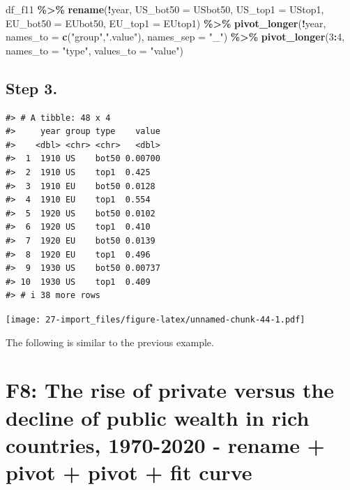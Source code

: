 \documentclass[
  xelatex, ja=standard]{bxjsbook}
\newenvironment{Shaded}{\begin{snugshade}}{\end{snugshade}}
\newcommand{\AttributeTok}[1]{\textcolor[rgb]{0.13,0.29,0.53}{#1}}
\newcommand{\DecValTok}[1]{\textcolor[rgb]{0.00,0.00,0.81}{#1}}
\newcommand{\FunctionTok}[1]{\textcolor[rgb]{0.13,0.29,0.53}{\textbf{#1}}}
\newcommand{\NormalTok}[1]{#1}
\newcommand{\SpecialCharTok}[1]{\textcolor[rgb]{0.81,0.36,0.00}{\textbf{#1}}}
\newcommand{\StringTok}[1]{\textcolor[rgb]{0.31,0.60,0.02}{#1}}
\theoremstyle{definition}
\theoremstyle{definition}
\theoremstyle{definition}
\theoremstyle{definition}
\theoremstyle{remark}
\begin{document}
\begin{Shaded}
\begin{Highlighting}[]
\NormalTok{df\_f11 }\SpecialCharTok{\%\textgreater{}\%} 
  \FunctionTok{rename}\NormalTok{(}\SpecialCharTok{!}\NormalTok{year, }\AttributeTok{US\_bot50 =}\NormalTok{ USbot50, }\AttributeTok{US\_top1 =}\NormalTok{ UStop1, }
         \AttributeTok{EU\_bot50 =}\NormalTok{ EUbot50, }\AttributeTok{EU\_top1 =}\NormalTok{ EUtop1) }\SpecialCharTok{\%\textgreater{}\%}
  \FunctionTok{pivot\_longer}\NormalTok{(}\SpecialCharTok{!}\NormalTok{year, }\AttributeTok{names\_to =} \FunctionTok{c}\NormalTok{(}\StringTok{"group"}\NormalTok{,}\StringTok{".value"}\NormalTok{), }
               \AttributeTok{names\_sep =} \StringTok{"\_"}\NormalTok{) }\SpecialCharTok{\%\textgreater{}\%}
  \FunctionTok{pivot\_longer}\NormalTok{(}\DecValTok{3}\SpecialCharTok{:}\DecValTok{4}\NormalTok{, }\AttributeTok{names\_to =} \StringTok{"type"}\NormalTok{, }\AttributeTok{values\_to =} \StringTok{"value"}\NormalTok{) }
\end{Highlighting}
\end{Shaded}

\hypertarget{step-3.-1}{%
\subsection{Step 3.}\label{step-3.-1}}

\begin{verbatim}
#> # A tibble: 48 x 4
#>     year group type    value
#>    <dbl> <chr> <chr>   <dbl>
#>  1  1910 US    bot50 0.00700
#>  2  1910 US    top1  0.425  
#>  3  1910 EU    bot50 0.0128 
#>  4  1910 EU    top1  0.554  
#>  5  1920 US    bot50 0.0102 
#>  6  1920 US    top1  0.410  
#>  7  1920 EU    bot50 0.0139 
#>  8  1920 EU    top1  0.496  
#>  9  1930 US    bot50 0.00737
#> 10  1930 US    top1  0.409  
#> # i 38 more rows
\end{verbatim}

\texttt{[image: 27-import\_files/figure-latex/unnamed-chunk-44-1.pdf]}

The following is similar to the previous example.

\hypertarget{f8-the-rise-of-private-versus-the-decline-of-public-wealth-in-rich-countries-1970-2020---rename-pivot-pivot-fit-curve}{%
\section{F8: The rise of private versus the decline of public wealth in rich countries, 1970-2020 - rename + pivot + pivot + fit curve}\label{f8-the-rise-of-private-versus-the-decline-of-public-wealth-in-rich-countries-1970-2020---rename-pivot-pivot-fit-curve}}
\end{document}
